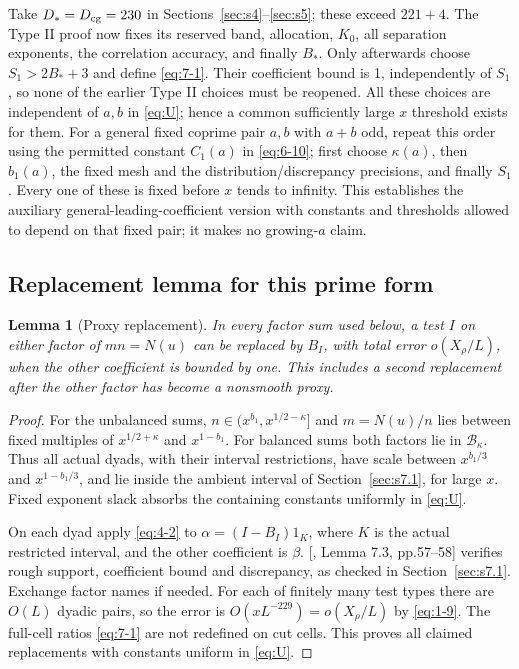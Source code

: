 \documentclass[11pt]{article}
\newtheorem{lemma}[theorem]{Lemma}
\theoremstyle{definition}
\theoremstyle{definition}
\begin{document}
Take \(D_*=D_{\rm cg}=230\) in Sections~\ref{sec:s4}--\ref{sec:s5}; these exceed \(221+4\). The Type II proof now fixes its reserved band, allocation, \(K_0\), all separation exponents, the correlation accuracy, and finally \(B_*\). Only afterwards choose \(S_1>2B_*+3\) and define \eqref{eq:7-1}. Their coefficient bound is 1, independently of \(S_1\), so none of the earlier Type II choices must be reopened. All these choices are independent of \(a,b\) in \eqref{eq:U}; hence a common sufficiently large \(x\) threshold exists for them. For a general fixed coprime pair \(a,b\) with \(a+b\) odd, repeat this order using the permitted constant \(C_1(a)\) in \eqref{eq:6-10}; first choose \(\kappa(a)\), then \(b_1(a)\), the fixed mesh and the distribution/discrepancy precisions, and finally \(S_1\). Every one of these is fixed before \(x\) tends to infinity. This establishes the auxiliary general-leading-coefficient version with constants and thresholds allowed to depend on that fixed pair; it makes no growing-\(a\) claim.

\subsection{Replacement lemma for this prime form}\label{sec:s7.3}

\begin{lemma}[Proxy replacement]\label{lem:replacement}
In every factor sum used below, a test \(I\) on either factor of \(mn=N(u)\) can be replaced by \(B_I\), with total error \(o(X_\rho/L)\), when the other coefficient is bounded by one. This includes a second replacement after the other factor has become a nonsmooth proxy.

\end{lemma}
\begin{proof}
For the unbalanced sums, \(n\in(x^{b_1},x^{1/2-\kappa}]\) and \(m=N(u)/n\) lies between fixed multiples of \(x^{1/2+\kappa}\) and \(x^{1-b_1}\). For balanced sums both factors lie in \(\mathcal B_\kappa\). Thus all actual dyads, with their interval restrictions, have scale between \(x^{b_1/3}\) and \(x^{1-b_1/3}\), and lie inside the ambient interval of Section~\ref{sec:s7.1}, for large \(x\). Fixed exponent slack absorbs the containing constants uniformly in \eqref{eq:U}.

On each dyad apply \eqref{eq:4-2} to \(\alpha=(I-B_I)1_K\), where \(K\) is the actual restricted interval, and the other coefficient is \(\beta\). [, Lemma 7.3, pp.57--58] verifies rough support, coefficient bound and discrepancy, as checked in Section~\ref{sec:s7.1}. Exchange factor names if needed. For each of finitely many test types there are \(O(L)\) dyadic pairs, so the error is \(O(xL^{-229})=o(X_\rho/L)\) by \eqref{eq:1-9}. The full-cell ratios \eqref{eq:7-1} are not redefined on cut cells. This proves all claimed replacements with constants uniform in \eqref{eq:U}. 


\end{proof}
\end{document}
